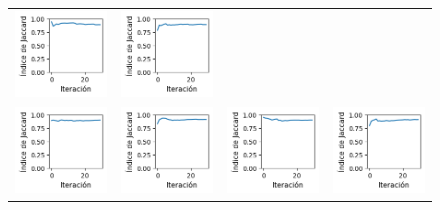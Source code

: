 \begin{figure}[!b]
\begin{tabular}{cccc}
        \includegraphics[width=3.5cm]{../Plots/score_epoch_6.png} &
        \includegraphics[width=3.5cm]{../Plots/score_epoch_7.png} \\
        \includegraphics[width=3.5cm]{../Plots/score_epoch_8.png} &
        \includegraphics[width=3.5cm]{../Plots/score_epoch_9.png} &
        \includegraphics[width=3.5cm]{../Plots/score_epoch_10.png} &
        \includegraphics[width=3.5cm]{../Plots/score_epoch_11.png} \\

\end{tabular}
\end{figure}
